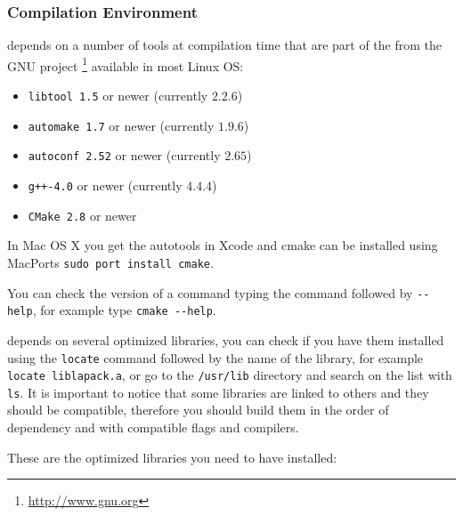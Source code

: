 \subsubsection{Compilation Environment}
\label{sec:comp-envir}

\lifev depends on a number of tools at compilation time that are part
of the  from the GNU project \footnote{\url{http://www.gnu.org}} 
available in most Linux OS:

\begin{itemize}
\item \verb!libtool 1.5! or newer (currently $2.2.6$)
\item \verb!automake 1.7! or newer (currently $1.9.6$)
\item \verb!autoconf 2.52! or newer (currently $2.65$)
\item \verb!g++-4.0! or newer (currently $4.4.4$)
\item \verb!CMake 2.8! or newer
\end{itemize}

In Mac OS X you get the autotools in Xcode and cmake can be 
installed using MacPorts \verb!sudo port install cmake!. 

You can check the version of a command typing the command followed by \verb!--help!, 
for example type \verb!cmake --help!. 

\lifev depends on several optimized libraries, you can check if you have them installed 
using the \verb!locate! command followed by the name of the library, for example 
\verb!locate liblapack.a!, or go to the \verb!/usr/lib! directory and search on the 
list with \verb!ls!. 
It is important to notice that some libraries are linked to others and they should 
be compatible, therefore you should build them in the order of dependency and with 
compatible flags and compilers. 

These are the optimized libraries you need to have installed:

